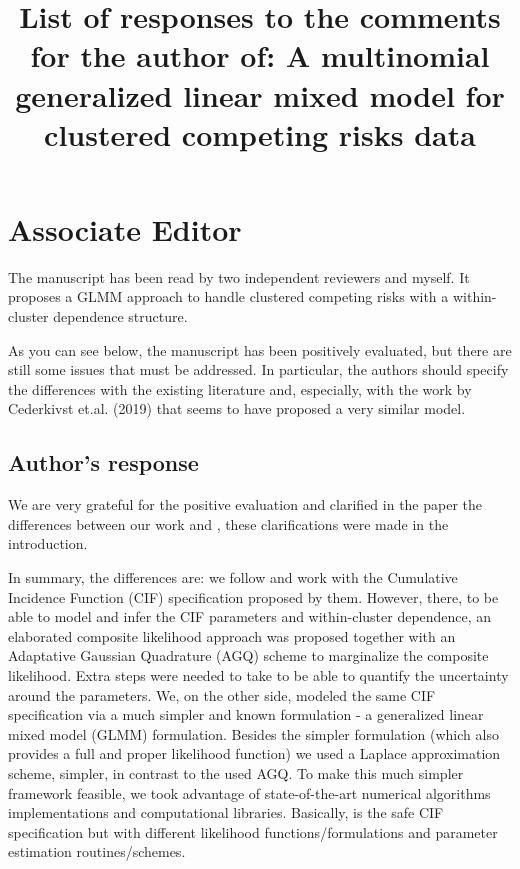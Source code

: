 \documentclass[a4paper,12pt]{article}
\title{

  List of responses to the comments for the author of:
  A multinomial generalized linear mixed model for clustered competing
  risks data

}
\begin{document}
\maketitle

\section*{Associate Editor}

The manuscript has been read by two independent reviewers and myself. It
proposes a GLMM approach to handle clustered competing risks with a
within-cluster dependence structure.

As you can see below, the manuscript has been positively evaluated, but
there are still some issues that must be addressed. In particular, the
authors should specify the differences with the existing literature and,
especially, with the work by Cederkivst et.al. (2019) that seems to have
proposed a very similar model.

\subsection*{Author's response}

We are very grateful for the positive evaluation and clarified in the
paper the differences between our work and \cite{SCHEIKE}, these
clarifications were made in the introduction.

In summary, the differences are: we follow \cite{SCHEIKE} and work with
the Cumulative Incidence Function (CIF) specification proposed by
them. However, there, to be able to model and infer the CIF parameters
and within-cluster dependence, an elaborated composite likelihood
approach was proposed together with an Adaptative Gaussian Quadrature
(AGQ) scheme to marginalize the composite likelihood. Extra steps were
needed to take to be able to quantify the uncertainty around the
parameters. We, on the other side, modeled the same CIF specification
via a much simpler and known formulation - a generalized linear mixed
model (GLMM) formulation. Besides the simpler formulation (which also
provides a full and proper likelihood function) we used a Laplace
approximation scheme, simpler, in contrast to the used AGQ. To make this
much simpler framework feasible, we took advantage of state-of-the-art
numerical algorithms implementations and computational
libraries. Basically, is the safe CIF specification but with different
likelihood functions/formulations and parameter estimation
routines/schemes.
\end{document}
